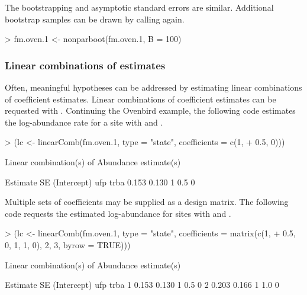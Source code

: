 \documentclass[article,shortnames]{jss}
\begin{document}
{The bootstrapping and asymptotic standard errors are similar. Additional 
bootstrap samples can be drawn by calling  again.

\begin{Schunk}
\begin{Sinput}
> fm.oven.1 <- nonparboot(fm.oven.1, B = 100)
\end{Sinput}
\end{Schunk}



\subsubsection{Linear combinations of estimates}

Often, meaningful hypotheses can be addressed by estimating linear
combinations of coefficient estimates.  Linear combinations of coefficient
estimates can be requested with . Continuing the Ovenbird 
example, the following code estimates the log-abundance rate for a site with 
 and .

\begin{Schunk}
\begin{Sinput}
> (lc <- linearComb(fm.oven.1, type = "state", coefficients = c(1, 
+     0.5, 0)))
\end{Sinput}
\begin{Soutput}
Linear combination(s) of Abundance estimate(s)

 Estimate    SE (Intercept) ufp trba
    0.153 0.130           1 0.5    0
\end{Soutput}
\end{Schunk}

Multiple sets of coefficients may be supplied as a design matrix.  The
following code requests the estimated log-abundance for sites with
 and . 

\begin{Schunk}
\begin{Sinput}
> (lc <- linearComb(fm.oven.1, type = "state", coefficients = matrix(c(1, 
+     0.5, 0, 1, 1, 0), 2, 3, byrow = TRUE)))
\end{Sinput}
\begin{Soutput}
Linear combination(s) of Abundance estimate(s)

  Estimate    SE (Intercept) ufp trba
1    0.153 0.130           1 0.5    0
2    0.203 0.166           1 1.0    0
\end{Soutput}
\end{Schunk}

}
\end{document}
